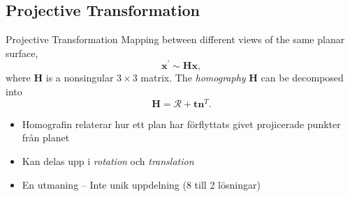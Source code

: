 \documentclass{beamer}
\renewcommand{\a}{\r{a}\xspace}
\renewcommand{\o}{\"o\xspace}
\renewcommand{\H}{\bm{H}}
\newcommand{\rotmat}{\bm{\mathcal{R}}}
\begin{document}
\subsection{Projective Transformation}

\begin{frame}{Projective Transformation}
	Mapping between different views of the same planar surface,
	\begin{equation*}
		\bm{x}^\prime \sim \H \bm{x},
	\end{equation*}
	where $\H$ is a nonsingular $3 \times 3$ matrix.
	\vspace{1em}
	The \textit{homography} $\H$ can be decomposed into
	\begin{equation*}
		\H = \rotmat + \bm{t} \bm{n}^T.
	\end{equation*}

	\note
	{
		\begin{itemize}
			\item Homografin relaterar hur ett plan har f\o{}rflyttats givet projicerade punkter fr\a{}n planet
			\item Kan delas upp i \textit{rotation} och \textit{translation}
			\item En utmaning -- Inte unik uppdelning (8 till 2 l\o{}sningar)
		\end{itemize}
	}
\end{frame}
\end{document}
